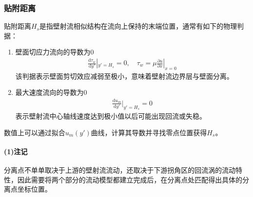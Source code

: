\subsubsection{贴附距离}
贴附距离$H_{s}$是指壁射流相似结构在流向上保持的末端位置，通常有如下的物理判据：
\begin{enumerate}
    \item 壁面切应力流向的导数为0
    \begin{align*}
        \frac{\mathrm{d}\tau_{w}}{\mathrm{d}y'}|_{y'=H_{s}}=0,\quad \tau_{w}=\mu\frac{\partial u}{\partial x}|_{x=0}
    \end{align*}
    该判据表示壁面剪切效应减弱至极小，意味着壁射流边界层与壁面分离。
    \item 最大速度流向的导数为0
    \begin{align*}
        \frac{\mathrm{d}u_{m}}{\mathrm{d}y'}|_{y'=H_{s}}=0
    \end{align*}
    表示壁射流中心轴线速度达到极小值以后可能出现回流或失稳。
\end{enumerate}
数值上可以通过拟合$u_{m}(y')$曲线，计算其导数并寻找零点位置获得$H_{s}$。

\paragraph{(1)注记}
分离点不单单取决于上游的壁射流流动，还取决于下游拐角区的回流涡的流动特性，因此需要将两个部分的流动模型都建立完成后，在分离点处匹配得出具体的分离点坐标位置。








